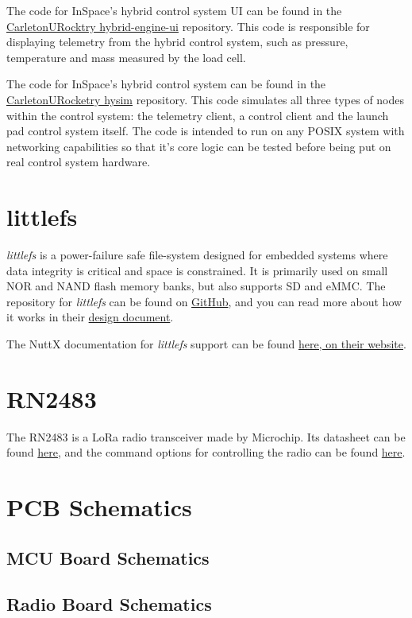 The code for InSpace's hybrid control system UI can be found in the
\href{https://github.com/CarletonURocketry/hybrid-engine-ui}{CarletonURocktry hybrid-engine-ui} repository. This code
is responsible for displaying telemetry from the hybrid control system, such as pressure, temperature and mass measured
by the load cell.

The code for InSpace's hybrid control system can be found in the
\href{https://github.com/CarletonURocketry/hysim}{CarletonURocketry hysim} repository. This code simulates all three
types of nodes within the control system: the telemetry client, a control client and the launch pad control system
itself. The code is intended to run on any POSIX system with networking capabilities so that it's core logic can be
tested before being put on real control system hardware.

\section{littlefs} \label{apx:littlefs}

\textit{littlefs} is a power-failure safe file-system designed for embedded systems where data integrity is critical and
space is constrained. It is primarily used on small NOR and NAND flash memory banks, but also supports SD and eMMC. The
repository for \textit{littlefs} can be found on \href{https://github.com/littlefs-project/littlefs}{GitHub}, and you can read more about how it works in their
\href{https://github.com/littlefs-project/littlefs/blob/master/DESIGN.md}{design document}.

The NuttX documentation for \textit{littlefs} support can be found
\href{https://nuttx.apache.org/docs/latest/components/filesystem/littlefs.html}{here, on their website}.

\section{RN2483} \label{apx:rn483}

The RN2483 is a LoRa radio transceiver made by Microchip. Its datasheet can be found
\href{https://ww1.microchip.com/downloads/aemDocuments/documents/OTH/ProductDocuments/DataSheets/RN2483-Low-Power-Long-Range-LoRa-Technology-Transceiver-Module-DS50002346F.pdf}{here},
and the command options for controlling the radio can be found
\href{https://ww1.microchip.com/downloads/en/DeviceDoc/RN2483-LoRa-Technology-Module-Command-Reference-User-Guide-DS40001784G.pdf}{here}.

\section{PCB Schematics} \label{apx:pcb-schematics}
\subsection{MCU Board Schematics}


\subsection{Radio Board Schematics}
